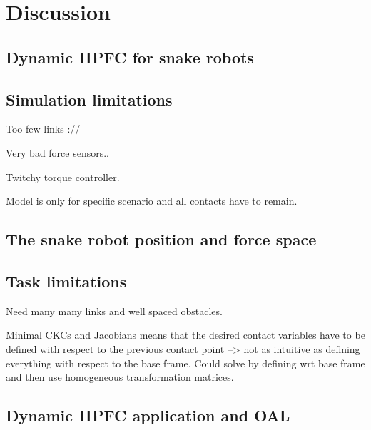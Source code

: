 \chapter{Discussion}\label{ch:discussion}


\section{Dynamic HPFC for snake robots}


\section{Simulation limitations}

Too few links ://

Very bad force sensors..

Twitchy torque controller.

Model is only for specific scenario and all contacts have to remain.

\section{The snake robot position and force space}

\section{Task limitations}

Need many many links and well spaced obstacles.

Minimal CKCs and Jacobians means that the desired contact variables have to be defined with respect to the previous contact point --> not as intuitive as defining everything with respect to the base frame. Could solve by defining wrt base frame and then use homogeneous transformation matrices.

\section{Dynamic HPFC application and OAL}